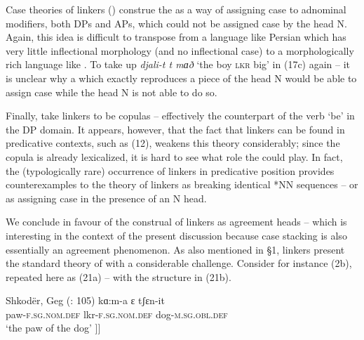 \documentclass[output=paper]{langsci/langscibook}
\begin{document}
  Case theories of linkers (\citealt{Larson2008}) construe the  as a way of assigning case to adnominal modifiers, both DPs and APs, which could not be assigned case by the head N. Again, this idea is difficult to transpose from a language like Persian which has very little inflectional morphology (and no inflectional case) to a morphologically rich language like . To take up \textit{djali-t t mɑð} ‘the boy \textsc{lkr} big’ in (17c) again – it is unclear why a  which exactly reproduces a piece of the head N would be able to assign case while the head N is not able to do so.    

  Finally, \citet{Dikken2004} take linkers to be copulas – effectively the counterpart of the verb ‘be’ in the DP domain. It appears, however, that the fact that linkers can be found in predicative contexts, such as  (12), weakens this theory considerably; since the copula is already lexicalized, it is hard to see what role the  could play. In fact, the (typologically rare) occurrence of linkers in predicative position provides counterexamples to the theory of linkers as breaking identical *NN sequences – or as assigning case in the presence of an N head. 

  We conclude in favour of the construal of linkers as agreement heads – which is interesting in the context of the present discussion because case stacking is also essentially an agreement phenomenon. As also mentioned in §1, linkers present the standard theory of  with a considerable challenge. Consider for instance  (2b), repeated here as (21a) – with the structure in (21b).

\ea%
    \label{ex:manzini:21}
    \ea Shkodër, Geg  (\citealt{Manzini2011Reducing}: 105)
    \gll kɑ:m-a      ɛ          tʃɛn-it          \\
         paw-\textsc{f.sg.nom.def}   lkr-\textsc{f.sg.nom.def}  dog-\textsc{m.sg.obl.def} \\
    \glt ‘the paw of the dog’
    \ex\relax [\textsubscript{DP} kɑ:ma    [\textsubscript{Lkr} ɛ  [\textsubscript{DP} tʃɛnit ]]] 
    \z
\z
\end{document}
